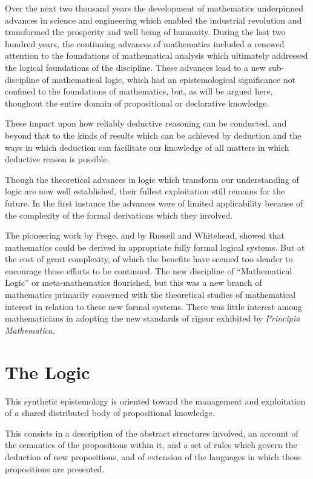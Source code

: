 \documentclass[10pt,titlepage]{book}
\begin{document}
Over the next two thousand years the development of mathematics underpinned advances in science and engineering which enabled the industrial revolution and transformed the prosperity and well being of humanity.
During the last two hundred years, the continuing advances of mathematics included a renewed attention to the foundations of mathematical analysis which ultimately addressed the logical foundations of the discipline.
These advances lead to a new sub-discipline of mathematical logic, which had an epistemological significance not confined to the foundations of mathematics, but, as will be argued here, thoughout the entire domain of propositional or declarative knowledge.

These impact upon how reliably deductive reasoning can be conducted, and beyond that to the kinds of results which can be achieved by deduction and the ways in which deduction can facilitate our knowledge of all matters in which deductive reason is possible.

Though the theoretical advances in logic which transform our understanding of logic are now well established, their fullest exploitation still remains for the future.
In the first instance the advances were of limited applicability because of the complexity of the formal derivations which they involved.

The pioneering work by Frege, and by Russell and Whitehead, showed that mathematics could be derived in appropriate fully formal logical systems.
But at the cost of great complexity, of which the benefits have seemed too slender to encourage those efforts to be continued.
The new discipline of ``Mathematical Logic'' or meta-mathematics flourished, but this was a new branch of mathematics primarily concerned with the theoretical studies of mathematical interest in relation to these new formal systems.
There was little interest among mathematicians in adopting the new standards of rigour exhibited by \emph{Principia Mathematica}\cite{russell1910}.

\section{The Logic}

This synthetic epistemology is oriented toward the management and exploitation of a shared distributed body of propositional knowledge.

This consists in a description of the abstract structures involved, an account of the semantics of the propositions within it, and a set of rules which govern the deduction of new propositions, and of extension of the languages in which these propositions are presented.
\end{document}
